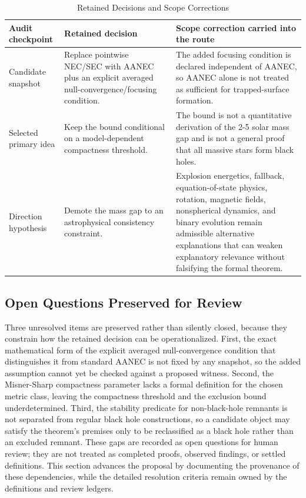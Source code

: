 \documentclass[conference]{IEEEtran}
\begin{document}
\begin{table}[htbp]
\centering
\footnotesize
\setlength{\tabcolsep}{3pt}
\renewcommand{\arraystretch}{1.12}
\caption{Retained Decisions and Scope Corrections}
\label{tab:appendix-idea-evolution-block-2}
\begin{tabular}{|p{}|p{}|p{}|}
\hline
Audit checkpoint & Retained decision & Scope correction carried into the route \\\hline
Candidate snapshot & Replace pointwise NEC/SEC with AANEC plus an explicit averaged null-convergence/focusing condition. & The added focusing condition is declared independent of AANEC, so AANEC alone is not treated as sufficient for trapped-surface formation. \\\hline
Selected primary idea & Keep the bound conditional on a model-dependent compactness threshold. & The bound is not a quantitative derivation of the 2-5 solar mass gap and is not a general proof that all massive stars form black holes. \\\hline
Direction hypothesis & Demote the mass gap to an astrophysical consistency constraint. & Explosion energetics, fallback, equation-of-state physics, rotation, magnetic fields, nonspherical dynamics, and binary evolution remain admissible alternative explanations that can weaken explanatory relevance without falsifying the formal theorem. \\\hline
\end{tabular}
\end{table}

\subsection{Open Questions Preserved for Review}
Three unresolved items are preserved rather than silently closed, because they constrain how the retained decision can be operationalized. First, the exact mathematical form of the explicit averaged null-convergence condition that distinguishes it from standard AANEC is not fixed by any snapshot, so the added assumption cannot yet be checked against a proposed witness. Second, the Misner-Sharp compactness parameter lacks a formal definition for the chosen metric class, leaving the compactness threshold and the exclusion bound underdetermined. Third, the stability predicate for non-black-hole remnants is not separated from regular black hole constructions, so a candidate object may satisfy the theorem's premises only to be reclassified as a black hole rather than an excluded remnant. These gaps are recorded as open questions for human review; they are not treated as completed proofs, observed findings, or settled definitions. This section advances the proposal by documenting the provenance of these dependencies, while the detailed resolution criteria remain owned by the definitions and review ledgers.
\end{document}
